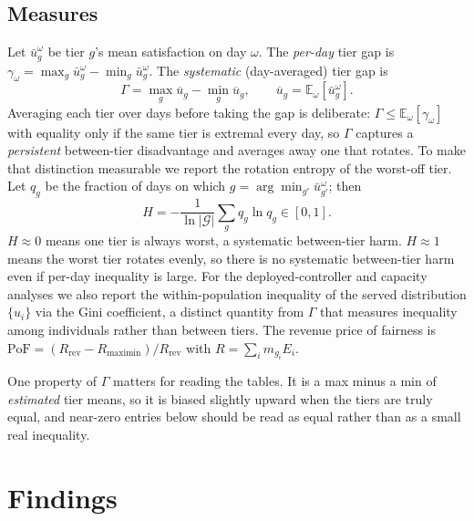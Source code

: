 \documentclass[manuscript, screen, review, anonymous]{acmart}
\begin{document}
\subsection{Measures}
\label{sec:measures}

Let $\bar u_g^\omega$ be tier $g$'s mean satisfaction on day $\omega$. The \emph{per-day} tier gap is $\gamma_\omega=\max_g\bar u_g^\omega-\min_g\bar u_g^\omega$. The \emph{systematic} (day-averaged) tier gap is
\begin{equation}
\Gamma=\max_g\overline{u}_g-\min_g\overline{u}_g,\qquad
\overline{u}_g=\mathbb{E}_\omega\!\left[\bar u_g^\omega\right].\label{eq:gamma}
\end{equation}
Averaging each tier over days before taking the gap is deliberate: $\Gamma\le\mathbb{E}_\omega[\gamma_\omega]$ with equality only if the same tier is extremal every day, so $\Gamma$ captures a \emph{persistent} between-tier disadvantage and averages away one that rotates. To make that distinction measurable we report the rotation entropy of the worst-off tier. Let $q_g$ be the fraction of days on which $g=\arg\min_{g'}\bar u_{g'}^\omega$; then
\begin{equation}
H=-\frac{1}{\ln|\mathcal{G}|}\sum_{g}q_g\ln q_g\in[0,1].\label{eq:entropy}
\end{equation}
$H\approx 0$ means one tier is always worst, a systematic between-tier harm. $H\approx 1$ means the worst tier rotates evenly, so there is no systematic between-tier harm even if per-day inequality is large. For the deployed-controller and capacity analyses we also report the within-population inequality of the served distribution $\{u_i\}$ via the Gini coefficient, a distinct quantity from $\Gamma$ that measures inequality among individuals rather than between tiers. The revenue price of fairness is $\mathrm{PoF}=(R_{\mathrm{rev}}-R_{\mathrm{maximin}})/R_{\mathrm{rev}}$ with $R=\sum_i m_{g_i} E_i$.

One property of $\Gamma$ matters for reading the tables. It is a max minus a min of \emph{estimated} tier means, so it is biased slightly upward when the tiers are truly equal, and near-zero entries below should be read as equal rather than as a small real inequality.

\section{Findings}
\label{sec:findings}
\end{document}

